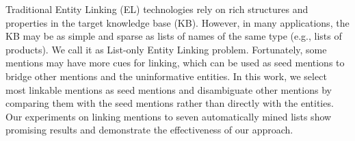 Traditional Entity Linking (EL) technologies rely on rich structures and properties in the target knowledge base (KB). However, in many applications, the KB may be as simple and sparse as lists of names of the same type (e.g., lists of products). We call it as List-only Entity Linking problem. Fortunately, some mentions may have more cues for linking, which can be used as seed mentions to bridge other mentions and the uninformative entities. In this work, we select most linkable mentions as seed mentions and disambiguate other mentions by comparing them with the seed mentions rather than directly with the entities. Our experiments on linking mentions to seven automatically mined lists show promising results and demonstrate the effectiveness of our approach.
